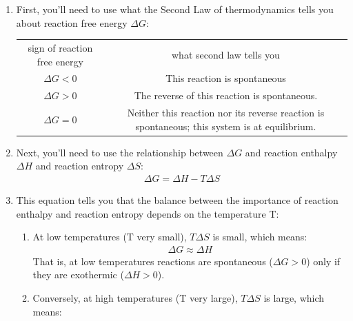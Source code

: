 \documentclass{article}  %
\begin{document}
\begin{enumerate}
    \item First, you'll need to use what the Second Law of thermodynamics tells you about reaction free energy $\Delta G$:
        \begin{center}
            \begin{tabular}{c c}
                sign of reaction free energy & what second law tells you \\
                $\Delta G < 0$ & This reaction is spontaneous \\
                $\Delta G > 0$ & The reverse of this reaction is spontaneous. \\
                $\Delta G = 0$ & Neither this reaction nor its reverse reaction is spontaneous; this system is at equilibrium.
            \end{tabular}
        \end{center}
    \item Next, you'll need to use the relationship between $\Delta G$ and reaction enthalpy $\Delta H$ and reaction entropy $\Delta S$:
            \begin{equation*}
                \begin{aligned}
                    \Delta G = \Delta H - T\Delta S 
                \end{aligned}
            \end{equation*}
    \item  This equation tells you that the balance between the importance of reaction enthalpy and reaction entropy depends on the temperature T:
        \begin{enumerate}
            \item At low temperatures (T very small), $T \Delta S$ is small, which means:
                \begin{equation*}
                    \begin{aligned}
                        \Delta G \approx \Delta H 
                    \end{aligned}
                \end{equation*}
                That is, at low temperatures reactions are spontaneous ($\Delta G >  0$) only if they are exothermic ($\Delta H > 0$).
            \item Conversely, at high temperatures (T very large), $T\Delta S$ is large, which means:
                \begin{equation*}
                    \begin{aligned}

\end{aligned}
\end{equation*}
\end{enumerate}
\end{enumerate}
\end{document}

